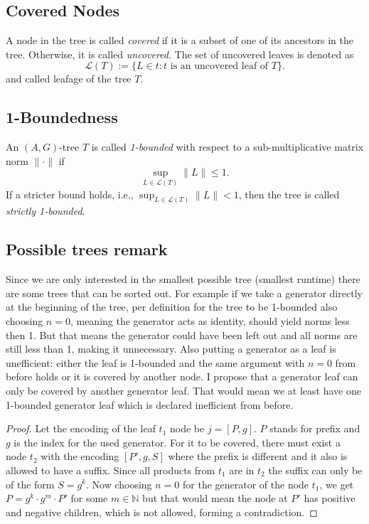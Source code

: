 \subsection*{Covered Nodes}
A node in the tree is called \textit{covered} if it is a subset of one of its ancestors in the tree. Otherwise, it is called \textit{uncovered}. The set of uncovered leaves is denoted as
\[
    \mathcal{L}(T) := \{ L \in t : t \text{ is an uncovered leaf of } T \}.
\]
and called leafage of the tree $T$.

\subsection*{1-Boundedness}
An \( (A,G) \)-tree $T$ is called \textit{1-bounded} with respect to a sub-multiplicative matrix norm \( \| \cdot \| \) if
\[
    \sup_{L \in \mathcal{L}(T)} \| L \| \leq 1.
\]
If a stricter bound holds, i.e., \( \sup_{L \in \mathcal{L}(T)} \| L \| < 1 \), then the tree is called \emph{strictly 1-bounded}.

\subsection*{Possible trees remark}
Since we are only interested in the smallest possible tree (smallest runtime) there are some trees that can be sorted out.
For example if we take a generator directly at the beginning of the tree, per definition for the tree to be 1-bounded also choosing $n = 0$, meaning the generator acts as identity, should yield norms less then 1. But that means the generator could have been left out and all norms are still less than 1, making it unnecessary. Also putting a generator as a leaf is unefficient: either the leaf is 1-bounded and the same argument with $n=0$ from before holds or it is covered by another node. I propose that a generator leaf can only be covered by another generator leaf. That would mean we at least have one 1-bounded generator leaf which is declared inefficient from before. 

\begin{proof}
    Let the encoding of the leaf $t_1$ node be $j = [P,g]$. $P$ stands for prefix and $g$ is the index for the used generator. For it to be covered, there must exist a node $t_2$ with the encoding $[P', g, S]$ where the prefix is different and it also is allowed to have a suffix. Since all products from $t_1$ are in $t_2$ the suffix can only be of the form $S = g^k$. Now choosing $n = 0$ for the generator of the node $t_1$, we get $P = g^k \cdot g^m \cdot P'$ for some $m \in \mathbb{N}$ but that would mean the node at $P'$ has positive and negative children, which is not allowed, forming a contradiction. 
\end{proof}

